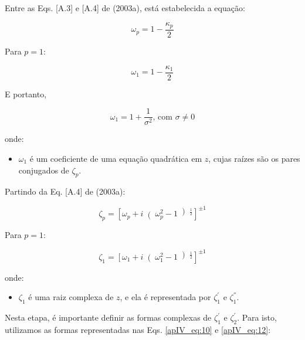 Entre as Eqs. [A.3] e [A.4] de  (2003a), está estabelecida a equação:

\begin{equation}
\label{apIV_eq:8}
\omega_{p} = 1 - \frac{\kappa_{p}}{2}
\end{equation}

Para $p = 1$:

\begin{equation}
\label{apIV_eq:9}
\omega_{1} = 1 - \frac{\kappa_{1}}{2}
\end{equation}

E portanto,

\begin{equation}
\label{apIV_eq:10}
\omega_{1} = 1 + \frac{1}{\sigma^{2}} \text{, com $\sigma \neq 0$}
\end{equation}

onde:

\begin{itemize}
	\item $\omega_{1}$ é um coeficiente de uma equação quadrática em $z$, cujas raízes são os pares conjugados de $\zeta_{p}$.
\end{itemize}

Partindo da Eq. [A.4] de  (2003a):

\begin{equation}
\label{apIV_eq:11}
\zeta_{p} = \left[\omega_{p} + i\right(\omega_{p}^{2} - 1\left)^{\frac{1}{2}}\right]^{\pm 1}
\end{equation}

Para $p = 1$:

\begin{equation}
\label{apIV_eq:12}
\zeta_{1} = \left[\omega_{1} + i\right(\omega_{1}^{2} - 1\left)^{\frac{1}{2}}\right]^{\pm 1}
\end{equation}

onde:

\begin{itemize}
	\item $\zeta_{1}$ é uma raiz complexa de $z$, e ela é representada por $\zeta_{1}^{'}$ e $\zeta_{1}^{''}$.
\end{itemize}

Nesta etapa, é importante definir as formas complexas de $\zeta_{1}^{'}$ e $\zeta_{2}^{'}$. Para isto, utilizamos as formas representadas nas Eqs. \ref{apIV_eq:10} e \ref{apIV_eq:12}:


